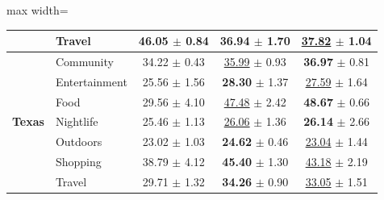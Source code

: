 \begin{table}[htbp]
\begin{adjustbox}{max width=\textwidth}
\begin{tabular}{clccc}
 & Travel & \textbf{46.05} $\pm$ 0.84 & 36.94 $\pm$ 1.70 & \underline{37.82} $\pm$ 1.04 \\
\midrule
\multirow{7}{*}{\textbf{Texas}} & Community & 34.22 $\pm$ 0.43 & \underline{35.99} $\pm$ 0.93 & \textbf{36.97} $\pm$ 0.81 \\
 & Entertainment & 25.56 $\pm$ 1.56 & \textbf{28.30} $\pm$ 1.37 & \underline{27.59} $\pm$ 1.64 \\
 & Food & 29.56 $\pm$ 4.10 & \underline{47.48} $\pm$ 2.42 & \textbf{48.67} $\pm$ 0.66 \\
 & Nightlife & 25.46 $\pm$ 1.13 & \underline{26.06} $\pm$ 1.36 & \textbf{26.14} $\pm$ 2.66 \\
 & Outdoors & 23.02 $\pm$ 1.03 & \textbf{24.62} $\pm$ 0.46 & \underline{23.04} $\pm$ 1.44 \\
 & Shopping & 38.79 $\pm$ 4.12 & \textbf{45.40} $\pm$ 1.30 & \underline{43.18} $\pm$ 2.19 \\
 & Travel & 29.71 $\pm$ 1.32 & \textbf{34.26} $\pm$ 0.90 & \underline{33.05} $\pm$ 1.51 \\
\bottomrule
\end{tabular}
\end{adjustbox}
\end{table}
